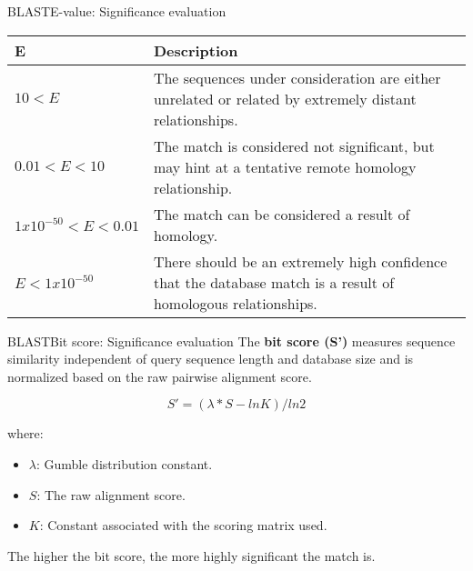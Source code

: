 \documentclass[10pt]{beamer}
\newcommand{\1}{
	\setbeamertemplate{background}{
		\texttt{[image: img/1]}
		\tikz[overlay] \fill[fill opacity=0.75,fill=white] (0,0) rectangle (-\paperwidth,\paperheight);
	}
}
\begin{document}
\begin{frame}{BLAST}{E-value: Significance evaluation}
	
	\begin{table}[]
		\begin{tabular}{|l|p{6cm}|}
			\hline
			\textbf{E} & \textbf{Description} \\ \hline
			
			$10 < E  $          & The sequences under consideration  are either unrelated or related by extremely distant relationships.         \\ \hline
			$0.01 < E < 10$          & The match is considered not significant, but
			may hint at a tentative remote homology relationship.          \\ \hline
			$1x10^{-50} < E < 0.01$          & The match can be considered a result		of homology.      \\  \hline  
			$E < 1x10^{-50}$          & There should be an extremely high confidence that the database match is a result of homologous 	relationships. \\  \hline
		\end{tabular}
	\end{table}
		
\end{frame}



\begin{frame}{BLAST}{Bit score: Significance evaluation}
	The \textbf{bit score (S')} measures sequence similarity independent of
	query sequence length and database size and is normalized based on the raw pairwise
	alignment score.
	\begin{block}{}
		\[
		S' = ( \lambda * S - lnK ) / ln2
		\]
	\end{block}
	where:
	\begin{itemize}
		\item $\lambda$: Gumble distribution constant.
		\item $S$: The raw alignment score.
		\item $K$: Constant associated with the scoring matrix used.
		
	\end{itemize}
	
	The higher the bit score, the more	highly significant the match is.
\end{frame}
\end{document}
